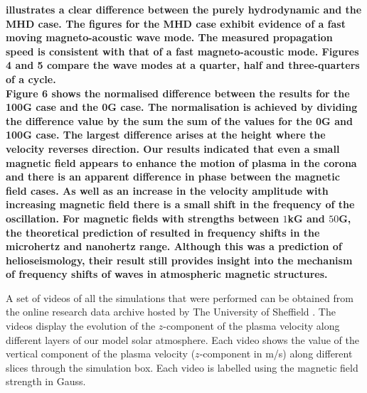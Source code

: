\documentclass[linenumbers]{aastex63}
\newcommand{\bcr}{\bf\color{red}} %
\begin{document}
 {\bcr
  illustrates a clear difference between the purely hydrodynamic and the MHD case. The figures for the MHD case exhibit evidence of a fast moving magneto-acoustic wave mode. The measured propagation speed is consistent with that of a fast magneto-acoustic mode. Figures 4 and 5 compare the wave modes at a quarter, half and three-quarters of a cycle.\\ Figure 6 shows the normalised difference between the results for the 100G case and the 0G case. The normalisation is achieved by dividing the difference value  by the sum the sum of the values for the 0G and 100G case. The largest difference arises at the height where the velocity reverses direction.   Our results indicated that even a small magnetic field appears to enhance the motion of plasma in the corona and  there is an apparent difference in phase between the magnetic field cases. As well as an increase in the velocity amplitude with increasing magnetic field there is a small shift in the frequency of the oscillation. For magnetic fields with strengths between $1$kG and $50$G, the theoretical prediction of \citet{Hindman1996} resulted in frequency shifts in the microhertz and nanohertz range.  Although this was a prediction of helioseismology, their result still provides insight into the mechanism of frequency shifts of waves in atmospheric magnetic structures. 
  }

A set of videos of all the simulations that were performed can be obtained from the online research data archive hosted by The University of Sheffield \citet{Griffiths2018a}. The videos display the evolution of the $z$-component of the plasma velocity along different layers of our model solar atmosphere. Each video shows the value of the vertical component of the plasma velocity ($z$-component in m/s) along different slices through the simulation box. Each video is labelled using the magnetic field strength in Gauss.







\end{document}
